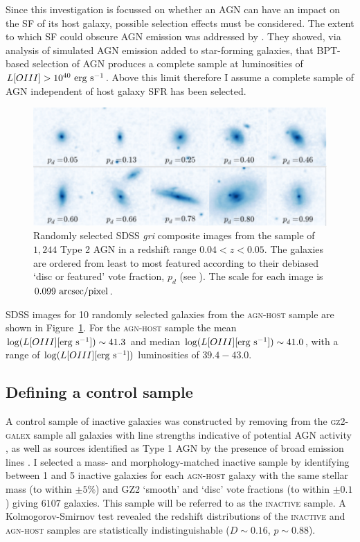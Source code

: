 Since this investigation is focussed on whether an AGN can have an impact on the SF of its host galaxy, possible selection effects must be considered. The extent to which SF could obscure AGN emission was addressed by \cite{schawinski10a}. They showed, via analysis of simulated AGN emission added to star-forming galaxies, that BPT-based selection of AGN produces a complete sample at luminosities of $L[OIII] > 10^{40}~\rm{erg~s}^{-1}$. Above this limit therefore I assume a complete sample of AGN independent of host galaxy SFR has been selected.

\begin{figure}
\includegraphics[width=\textwidth]{agn/fig1.pdf}
\caption[SDSS images of galaxies in the \textsc{agn-host} sample]{Randomly selected SDSS \emph{gri} composite images from the sample of $1,244$ Type 2 AGN in a redshift range $0.04 < z < 0.05$.  The galaxies are ordered from least to most featured according to their debiased `disc or featured' vote fraction, $p_d$ (see \citealt{GZ2}). The scale for each image is $0.099~\rm{arcsec/pixel}$.}
\label{mosaic}
\end{figure}

SDSS images for 10 randomly selected galaxies from the \textsc{agn-host} sample are shown in Figure~\ref{mosaic}.  For the \textsc{agn-host} sample the mean $\log (L[OIII] [\rm{erg~s^{-1}}]) \sim 41.3$ and median $\log (L[OIII] [\rm{erg~s^{-1}}]) \sim 41.0$, with a range of $\log (L[OIII] [\rm{erg~s^{-1}}])$ luminosities of $39.4-43.0$. 


\subsection{Defining a control sample}

A control sample of inactive galaxies was constructed by removing from the \textsc{gz2-galex} sample all galaxies with line strengths indicative of potential AGN activity \citep{kauffmann03b}, as well as sources identified as Type 1 AGN by the presence of broad emission lines \citep{Oh15}.  I selected a mass- and morphology-matched inactive sample by identifying between 1 and 5 inactive galaxies for each \textsc{agn-host} galaxy with the same stellar mass (to within $\pm5\%$) and GZ2 `smooth' and `disc' vote fractions (to within $\pm 0.1$) giving $6107$ galaxies. This sample will be referred to as the \textsc{inactive} sample. A Kolmogorov-Smirnov test revealed the redshift distributions of the \textsc{inactive} and \textsc{agn-host} samples are statistically indistinguishable ($D \sim 0.16$, $p \sim 0.88$). 

